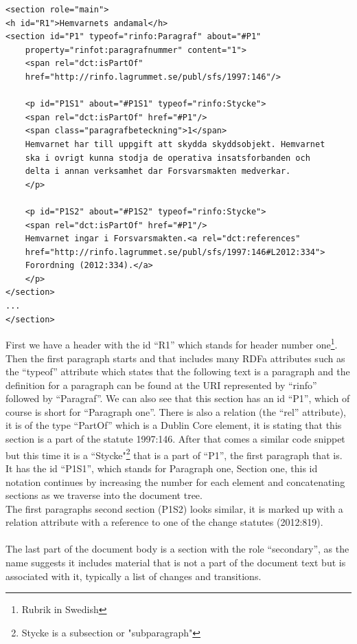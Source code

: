 \begin{verbatim}
<section role="main">
<h id="R1">Hemvarnets andamal</h>
<section id="P1" typeof="rinfo:Paragraf" about="#P1" 
    property="rinfot:paragrafnummer" content="1">
    <span rel="dct:isPartOf" 
	href="http://rinfo.lagrummet.se/publ/sfs/1997:146"/>
    
    <p id="P1S1" about="#P1S1" typeof="rinfo:Stycke">
    <span rel="dct:isPartOf" href="#P1"/>
    <span class="paragrafbeteckning">1</span>
    Hemvarnet har till uppgift att skydda skyddsobjekt. Hemvarnet 
    ska i ovrigt kunna stodja de operativa insatsforbanden och 
    delta i annan verksamhet dar Forsvarsmakten medverkar.
    </p>

    <p id="P1S2" about="#P1S2" typeof="rinfo:Stycke">
    <span rel="dct:isPartOf" href="#P1"/>
    Hemvarnet ingar i Forsvarsmakten.<a rel="dct:references" 
    href="http://rinfo.lagrummet.se/publ/sfs/1997:146#L2012:334">
    Forordning (2012:334).</a>
    </p>
</section>
...
</section>
\end{verbatim}
\linebreak
\newline
First we have a header with the id “R1” which stands for header number one\footnote{Rubrik in Swedish}. Then the first paragraph starts and that includes many RDFa attributes such as the “typeof” attribute which states that the following text is a paragraph and the definition for a paragraph can be found at the URI represented by “rinfo” followed by “Paragraf”. We can also see that this section has an id “P1”, which of course is short for “Paragraph one”. There is also a relation (the “rel” attribute), it is of the type “PartOf” which is a Dublin Core element, it is stating that this section is a part of the statute 1997:146. After that comes a similar code snippet but this time it is a “Stycke"\footnote{Stycke is a subsection or "subparagraph"} that is a part of “P1”, the first paragraph that is. It has the id “P1S1”, which stands for Paragraph one, Section one, this id notation continues by increasing the number for each element and concatenating sections as we traverse into the document tree.\\
The first paragraphs second section (P1S2) looks similar, it is marked up with a relation attribute with a reference to one of the change statutes (2012:819).\\\\
The last part of the document body is a section with the role “secondary”, as the name suggests it includes material that is not a part of the document text but is associated with it, typically a list of changes and transitions.\\

